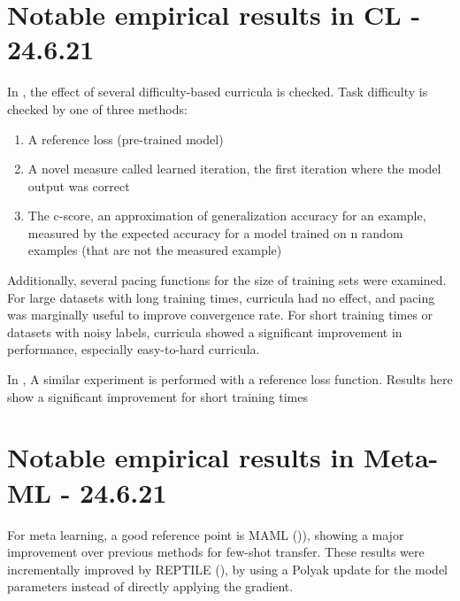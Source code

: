 \documentclass[letterpaper]{article}
\theoremstyle{definition}
\begin{document}
\section{Notable empirical results in CL - 24.6.21} \label{sec:empirical-cl}

In \cite{Anonymous2021}, the effect of several difficulty-based curricula is checked.
Task difficulty is checked by one of three methods:
\begin{enumerate}
	\item A reference loss (pre-trained model)
	\item A novel measure called learned iteration, the first iteration where the model output was correct
	\item The c-score, an approximation of generalization accuracy for an example, measured by the expected accuracy for a model trained on n random examples (that are not the measured example)
\end{enumerate}
Additionally, several pacing functions for the size of training sets were examined.
For large datasets with long training times, curricula had no effect, and pacing was marginally useful to improve convergence rate. For short training times or datasets with noisy labels, curricula showed a significant improvement in performance, especially easy-to-hard curricula.

In \cite{Hacohen2019}, A similar experiment is performed with a reference loss function. Results here show a significant improvement for short training times


\section{Notable empirical results in Meta-ML - 24.6.21} \label{sec:empirical-meta}

For meta learning, a good reference point is MAML (\cite{Finn2017})), showing a major improvement over previous methods for few-shot transfer.
These results were incrementally improved by REPTILE (\cite{Nichol2018}), by using a Polyak update for the model parameters instead of directly applying the gradient.
\end{document}
